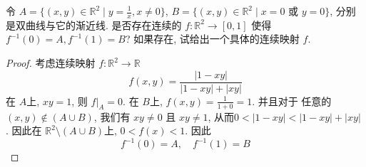 \documentclass[../main.tex]{subfiles}
\begin{document}
\begin{exercise}{}{}
令 $A = \{(x,y) \in \mathbb{R}^2 \mid y = \frac{1}{x}, x \neq 0\}$, $B = \{(x,y) \in \mathbb{R}^2 \mid x = 0$ 或 $y = 0\}$, 分别是双曲线与它的渐近线. 是否存在连续的 $f: \mathbb{R}^2 \to [0,1]$ 使得 $f^{-1}(0) = A, f^{-1}(1) = B$? 如果存在, 试给出一个具体的连续映射 $f$.
\end{exercise}
\begin{proof}
    考虑连续映射 \(  f:\mathbb{R} ^{2}\to \mathbb{R}   \) \[
    f\left( x ,y\right)= \frac{\left| 1-xy \right|  }{\left| 1-xy \right| + \left| xy \right|  } 
    \]在 \(  A  \)上, \(  xy= 1  \), 则 \(  f|_{A}= 0  \). 在 \(  B  \)上,  \(  f\left( x,y \right)= \frac{1 }{1+ 0 }= 1    \).     并且对于 任意的 \(  \left( x,y \right)\not \in \left( A\cup B \right)    \), 我们有 \(  xy\neq 0  \) 且 \(  xy\neq 1  \), 从而\(  0< \left| 1-xy \right|<  \left| 1-xy \right|+ \left| xy \right|     \)   . 因此在 \(  \mathbb{R} ^{2}\setminus \left( A\cup B \right)   \)上, \(  0< f\left( x \right)< 1   \). 因此  \[
    f^{-1} \left( 0 \right)= A,\quad f^{-1} \left( 1 \right)= B  
    \] 
\end{proof}
\end{document}
